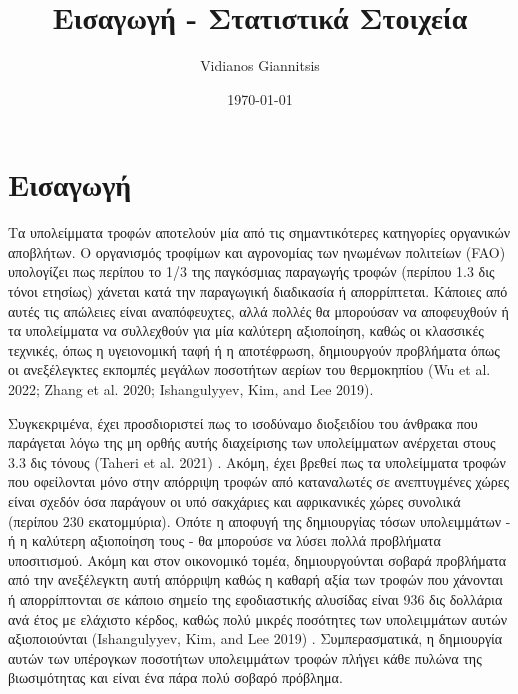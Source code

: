 \documentclass[11pt]{article}
\author{Vidianos Giannitsis}
\date{\today}
\title{Εισαγωγή - Στατιστικά Στοιχεία}
\begin{document}
\maketitle
\tableofcontents


\section{Εισαγωγή}
\label{sec:org1f77ea1}
Τα υπολείμματα τροφών αποτελούν μία από τις σημαντικότερες κατηγορίες οργανικών αποβλήτων. Ο οργανισμός τροφίμων και αγρονομίας των ηνωμένων πολιτείων (FAO) υπολογίζει πως περίπου το 1/3 της παγκόσμιας παραγωγής τροφών (περίπου 1.3 δις τόνοι ετησίως) χάνεται κατά την παραγωγική διαδικασία ή απορρίπτεται. Κάποιες από αυτές τις απώλειες είναι αναπόφευχτες, αλλά πολλές θα μπορούσαν να αποφευχθούν ή τα υπολείμματα να συλλεχθούν για μία καλύτερη αξιοποίηση, καθώς οι κλασσικές τεχνικές, όπως η υγειονομική ταφή ή η αποτέφρωση, δημιουργούν προβλήματα όπως οι ανεξέλεγκτες εκπομπές μεγάλων ποσοτήτων αερίων του θερμοκηπίου (Wu et al. 2022; Zhang et al. 2020; Ishangulyyev, Kim, and Lee 2019).

Συγκεκριμένα, έχει προσδιοριστεί πως το ισοδύναμο διοξειδίου του άνθρακα που παράγεται λόγω της μη ορθής αυτής διαχείρισης των υπολείμματων ανέρχεται στους 3.3 δις τόνους (Taheri et al. 2021) . Ακόμη, έχει βρεθεί πως τα υπολείμματα τροφών που οφείλονται μόνο στην απόρριψη τροφών από καταναλωτές σε ανεπτυγμένες χώρες είναι σχεδόν όσα παράγουν οι υπό σακχάριες και αφρικανικές χώρες συνολικά (περίπου 230 εκατομμύρια). Οπότε η αποφυγή της δημιουργίας τόσων υπολειμμάτων - ή η καλύτερη αξιοποίηση τους - θα μπορούσε να λύσει πολλά προβλήματα υποσιτισμού. Ακόμη και στον οικονομικό τομέα, δημιουργούνται σοβαρά προβλήματα από την ανεξέλεγκτη αυτή απόρριψη καθώς η καθαρή αξία των τροφών που χάνονται ή απορρίπτονται σε κάποιο σημείο της εφοδιαστικής αλυσίδας είναι 936 δις δολλάρια ανά έτος με ελάχιστο κέρδος, καθώς πολύ μικρές ποσότητες των υπολειμμάτων αυτών αξιοποιούνται (Ishangulyyev, Kim, and Lee 2019) . Συμπερασματικά, η δημιουργία αυτών των υπέρογκων ποσοτήτων υπολειμμάτων τροφών πλήγει κάθε πυλώνα της βιωσιμότητας και είναι ένα πάρα πολύ σοβαρό πρόβλημα.
\end{document}

